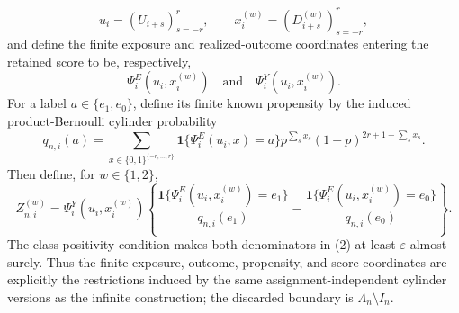 \[
 u_i=(U_{i+s})_{s=-r}^{r},
 \qquad
 x_i^{(w)}=(D_{i+s}^{(w)})_{s=-r}^{r},
\]
and define the finite exposure and realized-outcome coordinates entering the retained score to be, respectively,
\[
 \Psi_i^E(u_i,x_i^{(w)})
 \quad\text{and}\quad
 \Psi_i^Y(u_i,x_i^{(w)}).
\]
For a label \(a\in\{e_1,e_0\}\), define its finite known propensity by the induced product-Bernoulli cylinder probability
\[
 q_{n,i}(a)
 =\sum_{x\in\{0,1\}^{\{-r,\ldots,r\}}}
 \mathbf 1\{\Psi_i^E(u_i,x)=a\}
 p^{\sum_sx_s}(1-p)^{2r+1-\sum_sx_s}. \tag{1}
\]
Then define, for \(w\in\{1,2\}\),
\[
 Z_{n,i}^{(w)}
 =\Psi_i^Y(u_i,x_i^{(w)})
 \left\{
  \frac{\mathbf 1\{\Psi_i^E(u_i,x_i^{(w)})=e_1\}}{q_{n,i}(e_1)}
  -\frac{\mathbf 1\{\Psi_i^E(u_i,x_i^{(w)})=e_0\}}{q_{n,i}(e_0)}
 \right\}. \tag{2}
\]
The class positivity condition makes both denominators in (2) at least \(\varepsilon\) almost surely.  Thus the finite exposure, outcome, propensity, and score coordinates are explicitly the restrictions induced by the same assignment-independent cylinder versions as the infinite construction; the discarded boundary is \(\Lambda_n\setminus I_n\).
